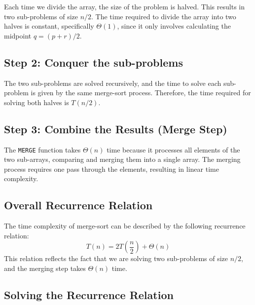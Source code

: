     Each time we divide the array, the size of the problem is halved. This results in two sub-problems of size \(n/2\). The time required to divide the array into two halves is constant, specifically \(\Theta(1)\), since it only involves calculating the midpoint \(q = (p + r) / 2\).
    
    \subsection{Step 2: Conquer the sub-problems}
    
    The two sub-problems are solved recursively, and the time to solve each sub-problem is given by the same merge-sort process. Therefore, the time required for solving both halves is \(T(n/2)\).
    
    \subsection{Step 3: Combine the Results (Merge Step)}
    
    The \texttt{MERGE} function takes \(\Theta(n)\) time because it processes all elements of the two sub-arrays, comparing and merging them into a single array. The merging process requires one pass through the elements, resulting in linear time complexity.
    
    \subsection{Overall Recurrence Relation}
    
    The time complexity of merge-sort can be described by the following recurrence relation:
    \[
    T(n) = 2T\left(\frac{n}{2}\right) + \Theta(n)
    \]
    This relation reflects the fact that we are solving two sub-problems of size \(n/2\), and the merging step takes \(\Theta(n)\) time.
    
    \subsection{Solving the Recurrence Relation}
    
